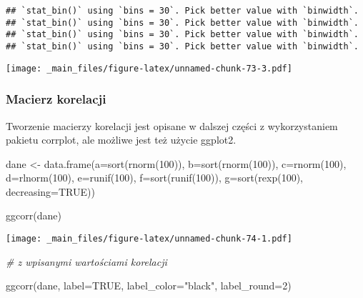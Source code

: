 \documentclass[
]{book}
\newenvironment{Shaded}{\begin{snugshade}}{\end{snugshade}}
\newcommand{\AttributeTok}[1]{\textcolor[rgb]{0.77,0.63,0.00}{#1}}
\newcommand{\CommentTok}[1]{\textcolor[rgb]{0.56,0.35,0.01}{\textit{#1}}}
\newcommand{\ConstantTok}[1]{\textcolor[rgb]{0.00,0.00,0.00}{#1}}
\newcommand{\DecValTok}[1]{\textcolor[rgb]{0.00,0.00,0.81}{#1}}
\newcommand{\FunctionTok}[1]{\textcolor[rgb]{0.00,0.00,0.00}{#1}}
\newcommand{\NormalTok}[1]{#1}
\newcommand{\OtherTok}[1]{\textcolor[rgb]{0.56,0.35,0.01}{#1}}
\newcommand{\StringTok}[1]{\textcolor[rgb]{0.31,0.60,0.02}{#1}}
\begin{document}
\begin{verbatim}
## `stat_bin()` using `bins = 30`. Pick better value with `binwidth`.
## `stat_bin()` using `bins = 30`. Pick better value with `binwidth`.
## `stat_bin()` using `bins = 30`. Pick better value with `binwidth`.
## `stat_bin()` using `bins = 30`. Pick better value with `binwidth`.
\end{verbatim}

\texttt{[image: \_main\_files/figure-latex/unnamed-chunk-73-3.pdf]}

\hypertarget{macierz-korelacji}{%
\subsubsection{Macierz korelacji}\label{macierz-korelacji}}

Tworzenie macierzy korelacji jest opisane w dalszej części z wykorzystaniem pakietu corrplot, ale możliwe jest też użycie ggplot2.

\begin{Shaded}
\begin{Highlighting}[]
\NormalTok{dane }\OtherTok{\textless{}{-}} \FunctionTok{data.frame}\NormalTok{(}\AttributeTok{a=}\FunctionTok{sort}\NormalTok{(}\FunctionTok{rnorm}\NormalTok{(}\DecValTok{100}\NormalTok{)), }\AttributeTok{b=}\FunctionTok{sort}\NormalTok{(}\FunctionTok{rnorm}\NormalTok{(}\DecValTok{100}\NormalTok{)), }\AttributeTok{c=}\FunctionTok{rnorm}\NormalTok{(}\DecValTok{100}\NormalTok{), }\AttributeTok{d=}\FunctionTok{rlnorm}\NormalTok{(}\DecValTok{100}\NormalTok{), }\AttributeTok{e=}\FunctionTok{runif}\NormalTok{(}\DecValTok{100}\NormalTok{),}
                   \AttributeTok{f=}\FunctionTok{sort}\NormalTok{(}\FunctionTok{runif}\NormalTok{(}\DecValTok{100}\NormalTok{)), }\AttributeTok{g=}\FunctionTok{sort}\NormalTok{(}\FunctionTok{rexp}\NormalTok{(}\DecValTok{100}\NormalTok{), }\AttributeTok{decreasing=}\ConstantTok{TRUE}\NormalTok{))}

\FunctionTok{ggcorr}\NormalTok{(dane)}
\end{Highlighting}
\end{Shaded}

\texttt{[image: \_main\_files/figure-latex/unnamed-chunk-74-1.pdf]}

\begin{Shaded}
\begin{Highlighting}[]
\CommentTok{\# z wpisanymi wartościami korelacji}

\FunctionTok{ggcorr}\NormalTok{(dane, }\AttributeTok{label=}\ConstantTok{TRUE}\NormalTok{, }\AttributeTok{label\_color=}\StringTok{"black"}\NormalTok{, }\AttributeTok{label\_round=}\DecValTok{2}\NormalTok{)}
\end{Highlighting}
\end{Shaded}
\end{document}
